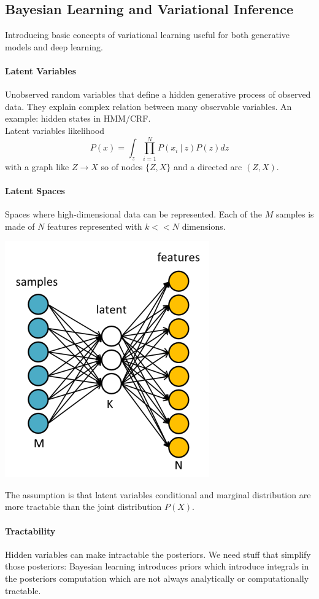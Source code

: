 \documentclass[10pt]{report}
\begin{document}
\subsection{Bayesian Learning and Variational Inference}
Introducing basic concepts of variational learning useful for both generative models and deep learning.
\paragraph{Latent Variables} Unobserved random variables that define a hidden generative process of observed data. They explain complex relation between many observable variables. An example: hidden states in HMM/CRF.\\
Latent variables likelihood $$P(x) = \int_z \prod_{i=1}^N P(x_i\:|\:z)P(z)dz$$ with a graph like $Z \longrightarrow X$ so of nodes $\{Z,X\}$ and a directed arc $(Z,X)$.
\paragraph{Latent Spaces} Spaces where high-dimensional data can be represented. Each of the $M$ samples is made of $N$ features represented with $k<<N$ dimensions.
\begin{center}
	\includegraphics[scale=0.5]{39.png}
\end{center}
The assumption is that latent variables conditional and marginal distribution are more tractable than the joint distribution $P(X)$.
\paragraph{Tractability} Hidden variables can make intractable the posteriors. We need stuff that simplify those posteriors: Bayesian learning introduces priors which introduce integrals in the posteriors computation which are not always analytically or computationally tractable.
\end{document}
